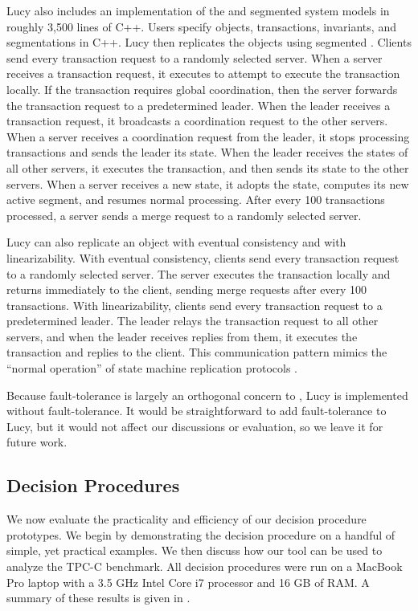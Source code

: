 Lucy also includes an implementation of the \invariantconfluence{} and
segmented \invariantconfluence{} system models in roughly 3,500 lines of C++.
Users specify objects, transactions, invariants, and segmentations in C++. Lucy
then replicates the objects using segmented \invariantconfluence{}. Clients
send every transaction request to a randomly selected server. When a server
receives a transaction request, it executes  to attempt
to execute the transaction locally.  If the transaction requires global
coordination, then the server forwards the transaction request to a
predetermined leader. When the leader receives a transaction request, it
broadcasts a coordination request to the other servers. When a server receives
a coordination request from the leader, it stops processing transactions and
sends the leader its state.  When the leader receives
the states of all other servers, it executes the transaction, and then sends
its state to the other servers. When a server receives a new state, it adopts
the state, computes its new active segment, and resumes normal processing.
After every 100 transactions processed, a server sends a merge request to a
randomly selected server.

Lucy can also replicate an object with eventual consistency and with
linearizability. With eventual consistency, clients send every transaction
request to a randomly selected server. The server executes the transaction
locally and returns immediately to the client, sending merge requests after
every 100 transactions. With linearizability, clients send every transaction
request to a predetermined leader. The leader relays the transaction request to
all other servers, and when the leader receives replies from them, it executes
the transaction and replies to the client. This communication pattern mimics
the ``normal operation'' of state machine replication protocols
\cite{lamport1998part, liskov2012viewstamped}.

Because fault-tolerance is largely an orthogonal concern to
\invariantconfluence{}, Lucy is implemented without fault-tolerance. It would
be straightforward to add fault-tolerance to Lucy, but it would not affect our
discussions or evaluation, so we leave it for future work.

\subsection{Decision Procedures}
We now evaluate the practicality and efficiency of our decision procedure
prototypes. We begin by demonstrating the decision procedure on a handful of
simple, yet practical examples. We then discuss how our tool can be used to
analyze the TPC-C benchmark. All decision procedures were run on a MacBook Pro
laptop with a 3.5 GHz Intel Core i7 processor and 16 GB of RAM. A summary of
these results is given in .

